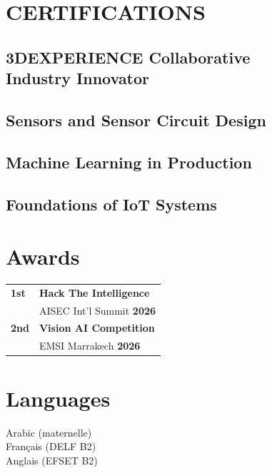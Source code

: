 \documentclass[]{plushcv}
\begin{document}
\begin{minipage}[t]{0.24\textwidth}
\vspace{4pt}
\section{CERTIFICATIONS}
\sectionsep

\subsection{3DEXPERIENCE Collaborative \\ Industry Innovator}
\vspace*{2pt}

\subsection{Sensors and Sensor Circuit Design}
\vspace*{2pt}

\subsection{Machine Learning in Production}
\vspace*{2pt}

\subsection{Foundations of IoT Systems}
\sectionsep
\vspace{2pt}
\section{Awards}
\begin{tabular}{@{}p{0.5cm} p{3.8cm}}
\textbf{\large 1st} & \textbf{Hack The Intelligence} \\
 & {\footnotesize AISEC Int'l Summit \textbf{2026}} \\[4pt]
\textbf{\large 2nd} & \textbf{Vision AI Competition} \\
 & {\footnotesize EMSI Marrakech \textbf{2026}} \\
\end{tabular}
\sectionsep
\vspace{0.5pt}
\section{Languages}
\vspace{2pt}

\begin{flushleft}
 \textbullet{} Arabic (maternelle) \\ \textbullet{} Français (DELF B2) \\ \textbullet{} Anglais (EFSET B2)
\end{flushleft}
\vfill

\end{minipage} 
\end{document}
